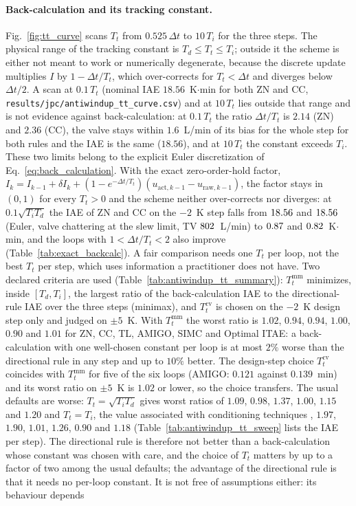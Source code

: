 \documentclass[11pt]{article}
\begin{document}
\paragraph{Back-calculation and its tracking constant.} Fig.~\ref{fig:tt_curve} scans $T_t$ from $0.525\,\Delta t$ to $10\,T_i$ for the three steps. The physical range of the tracking constant is $T_d \le T_t \le T_i$; outside it the scheme is either not meant to work or numerically degenerate, because the discrete update multiplies $I$ by $1 - \Delta t/T_t$, which over-corrects for $T_t < \Delta t$ and diverges below $\Delta t/2$. A scan at $0.1\,T_t$ (nominal IAE $18.56$~K$\cdot$min for both ZN and CC, \texttt{results/jpc/antiwindup\_tt\_curve.csv}) and at $10\,T_t$ lies outside that range and is not evidence against back-calculation: at $0.1\,T_t$ the ratio $\Delta t/T_t$ is $2.14$ (ZN) and $2.36$ (CC), the valve stays within $1.6$~L/min of its bias for the whole step for both rules and the IAE is the same ($18.56$), and at $10\,T_t$ the constant exceeds $T_i$. These two limits belong to the explicit Euler discretization of Eq.~\eqref{eq:back_calculation}. With the exact zero-order-hold factor, $I_k = I_{k-1} + \delta I_k + (1 - e^{-\Delta t/T_t})(u_{\text{act},k-1} - u_{\text{raw},k-1})$, the factor stays in $(0, 1)$ for every $T_t > 0$ and the scheme neither over-corrects nor diverges: at $0.1\sqrt{T_iT_d}$ the IAE of ZN and CC on the $-2$~K step falls from $18.56$ and $18.56$ (Euler, valve chattering at the slew limit, TV $802$~L/min) to $0.87$ and $0.82$~K$\cdot$min, and the loops with $1 < \Delta t/T_t < 2$ also improve (Table~\ref{tab:exact_backcalc}). A fair comparison needs one $T_t$ per loop, not the best $T_t$ per step, which uses information a practitioner does not have. Two declared criteria are used (Table~\ref{tab:antiwindup_tt_summary}): $T_t^{\mathrm{mm}}$ minimizes, inside $[T_d, T_i]$, the largest ratio of the back-calculation IAE to the directional-rule IAE over the three steps (minimax), and $T_t^{\mathrm{cv}}$ is chosen on the $-2$~K design step only and judged on $\pm 5$~K. With $T_t^{\mathrm{mm}}$ the worst ratio is $1.02$, $0.94$, $0.94$, $1.00$, $0.90$ and $1.01$ for ZN, CC, TL, AMIGO, SIMC and Optimal ITAE: a back-calculation with one well-chosen constant per loop is at most $2\%$ worse than the directional rule in any step and up to $10\%$ better. The design-step choice $T_t^{\mathrm{cv}}$ coincides with $T_t^{\mathrm{mm}}$ for five of the six loops (AMIGO: $0.121$ against $0.139$~min) and its worst ratio on $\pm 5$~K is $1.02$ or lower, so the choice transfers. The usual defaults are worse: $T_t = \sqrt{T_iT_d}$ gives worst ratios of $1.09$, $0.98$, $1.37$, $1.00$, $1.15$ and $1.20$ and $T_t = T_i$, the value associated with conditioning techniques \cite{peng1996nonlinear}, $1.97$, $1.90$, $1.01$, $1.26$, $0.90$ and $1.18$ (Table~\ref{tab:antiwindup_tt_sweep} lists the IAE per step). The directional rule is therefore not better than a back-calculation whose constant was chosen with care, and the choice of $T_t$ matters by up to a factor of two among the usual defaults; the advantage of the directional rule is that it needs no per-loop constant. It is not free of assumptions either: its behaviour depends 
\end{document}
